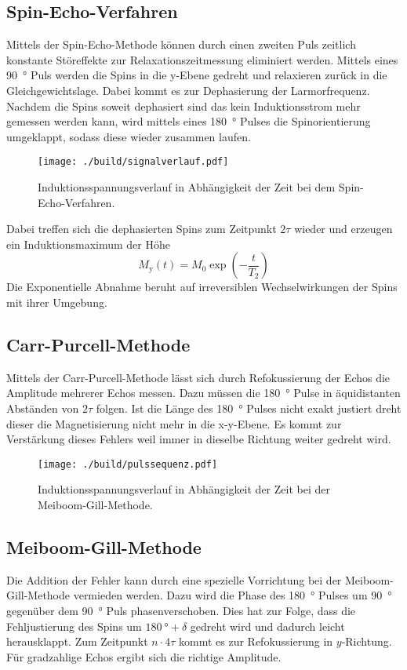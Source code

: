 \subsection{Spin-Echo-Verfahren}%
\label{sub:spin_echo_verfahren}
Mittels der Spin-Echo-Methode können durch einen zweiten Puls zeitlich
konstante Störeffekte zur Relaxationszeitmessung eliminiert werden. 
Mittels eines \SI{90}{\degree} Puls werden die Spins in die y-Ebene gedreht
und relaxieren zurück in die Gleichgewichtslage.
Dabei kommt es zur Dephasierung der Larmorfrequenz. 
Nachdem die Spins soweit dephasiert sind das kein Induktionsstrom mehr gemessen
werden kann, wird mittels eines \SI{180}{\degree} Pulses die Spinorientierung umgeklappt, 
sodass diese wieder zusammen laufen.
\begin{figure}[h]
		\centering
		\texttt{[image: ./build/signalverlauf.pdf]}
		\caption{Induktionsspannungsverlauf in Abhängigkeit der Zeit bei dem
		Spin-Echo-Verfahren. \cite{anleitung}}%
		\label{fig:sign}
\end{figure}
Dabei treffen sich die dephasierten Spins zum Zeitpunkt $2 \tau$ wieder und
erzeugen ein Induktionsmaximum der Höhe 
\begin{equation}
		\label{eq:}
		M_\text{y}(t) = M_0 \exp\left(-\frac{t}{T_2} \right)
\end{equation}
Die Exponentielle Abnahme beruht auf irreversiblen Wechselwirkungen der Spins mit
ihrer Umgebung. 

\subsection{Carr-Purcell-Methode}%
\label{sub:car_purcell}
Mittels der Carr-Purcell-Methode lässt sich durch Refokussierung der Echos die
Amplitude mehrerer Echos messen. 
Dazu müssen die \SI{180}{\degree} Pulse in äquidistanten Abständen von $2\tau$
folgen. 
Ist die Länge des \SI{180}{\degree} Pulses nicht exakt justiert dreht dieser die
Magnetisierung nicht mehr in die x-y-Ebene. 
Es kommt zur Verstärkung dieses Fehlers weil immer in dieselbe Richtung weiter
gedreht wird.

\begin{figure}[ht]
		\centering
		\texttt{[image: ./build/pulssequenz.pdf]}
		\caption{Induktionsspannungsverlauf in Abhängigkeit der Zeit bei der
		Meiboom-Gill-Methode. \cite{anleitung}}%
		\label{fig:}
\end{figure}

\subsection{Meiboom-Gill-Methode}%
\label{sub:meiboom_gill_methode}
Die Addition der Fehler kann durch eine spezielle Vorrichtung bei der
Meiboom-Gill-Methode vermieden werden.
Dazu wird die Phase des \SI{180}{\degree} Pulses um \SI{90}{\degree} gegenüber
dem \SI{90}{\degree} Puls phasenverschoben.
Dies hat zur Folge, dass die Fehljustierung des Spins um $\SI{180}{\degree} 
+ \delta$ gedreht wird und dadurch leicht herausklappt. 
Zum Zeitpunkt $n \cdot 4 \tau$ kommt es zur Refokussierung in $y$-Richtung.
Für gradzahlige Echos ergibt sich die richtige Amplitude.

